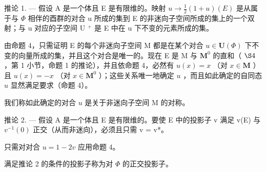 推论 1. --- 假设 A 是一个体且 E 是有限维的。映射 \(u \to \frac{1}{2}(1 + u)(E)\) 是从属于与 \(\Phi\) 相伴的酉群的对合 u 所成的集到 E 的非迷向子空间所成的集上的一个双射；与 u 对应的子空间 U \(^+\) 是 E 中在 u 下不变的元素所成的集。

由命题 4，只需证明 E 的每个非迷向子空间 M 都是在某个对合 \(u \in \mathbf{U}(\Phi)\) 下不变的向量所成的集，并且这个对合是唯一的。现在 E 是 M 与 \(\mathbf{M}^0\) 的直和（ \(\S 4\) ，第 1 小节，命题 1 的推论），并且依命题 4，必然有 \(u(x) = x\) （对 \(x \in \mathbf{M}\) ）且 \(u(x) = -x\) （对 \(x \in \mathbf{M}^0\) ）；这些关系唯一地确定 \(u\) ，而且如此确定的自同态 \(u\) 显然满足要求（命题 4）。

我们称如此确定的对合 \(u\) 是关于非迷向子空间 M 的对称。

推论 2. --- 假设 A 是一个体且 E 是有限维的。要使 E 中的投影子 v 满足 v(E) 与 \(v^{-1}(0)\) 正交（从而非迷向），必须且只需 v = v*。

只需对对合 \(u = 1 - 2v\) 应用命题 4。

满足推论 2 的条件的投影子称为对 \(\Phi\) 的正交投影子。

